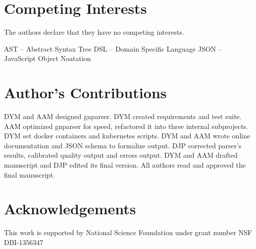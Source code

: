 \documentclass{bmcart}
\begin{document}
\section*{Competing Interests}

The authors declare that they have no competing interests.

AST -- Abstract Syntax Tree
DSL -- Domain Specific Language
JSON -- JavaScript Object Noatation

\section*{Author's Contributions}

DYM and AAM designed gnparser. DYM created requirements and test suite. AAM
optimized gnparser for speed, refactored it into three internal subprojects.
DYM set docker containers and kubernetes scripts. DYM and AAM wrote online
documentation and JSON schema to formalize output. DJP corrected parser's
results, calibrated quality output and errors output. DYM and AAM drafted
manuscript and DJP edited its final version. All authors read and approved the
final manuscript.

\section*{Acknowledgements}

This work is supported by National Science Foundation under grant number NSF
DBI-1356347



\end{document}
